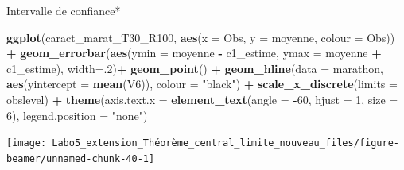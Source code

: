 \documentclass[ignorenonframetext,]{beamer}
\newenvironment{Shaded}{\begin{snugshade}}{\end{snugshade}}
\newcommand{\KeywordTok}[1]{\textcolor[rgb]{0.13,0.29,0.53}{\textbf{#1}}}
\newcommand{\DataTypeTok}[1]{\textcolor[rgb]{0.13,0.29,0.53}{#1}}
\newcommand{\DecValTok}[1]{\textcolor[rgb]{0.00,0.00,0.81}{#1}}
\newcommand{\StringTok}[1]{\textcolor[rgb]{0.31,0.60,0.02}{#1}}
\newcommand{\OperatorTok}[1]{\textcolor[rgb]{0.81,0.36,0.00}{\textbf{#1}}}
\newcommand{\NormalTok}[1]{#1}
\begin{document}
\begin{frame}[fragile]{Intervalle de confiance*}

\begin{Shaded}
\begin{Highlighting}[]
\KeywordTok{ggplot}\NormalTok{(caract_marat_T30_R100, }\KeywordTok{aes}\NormalTok{(}\DataTypeTok{x =}\NormalTok{ Obs, }\DataTypeTok{y =}\NormalTok{ moyenne, }\DataTypeTok{colour =}\NormalTok{ Obs)) }\OperatorTok{+}
\StringTok{  }\KeywordTok{geom_errorbar}\NormalTok{(}\KeywordTok{aes}\NormalTok{(}\DataTypeTok{ymin =}\NormalTok{ moyenne }\OperatorTok{-}\StringTok{ }\NormalTok{c1_estime, }\DataTypeTok{ymax =}\NormalTok{ moyenne }\OperatorTok{+}\StringTok{ }\NormalTok{c1_estime), }\DataTypeTok{width=}\NormalTok{.}\DecValTok{2}\NormalTok{)}\OperatorTok{+}\StringTok{ }
\StringTok{  }\KeywordTok{geom_point}\NormalTok{() }\OperatorTok{+}
\StringTok{  }\KeywordTok{geom_hline}\NormalTok{(}\DataTypeTok{data =}\NormalTok{ marathon, }\KeywordTok{aes}\NormalTok{(}\DataTypeTok{yintercept =} \KeywordTok{mean}\NormalTok{(V6)), }\DataTypeTok{colour =} \StringTok{"black"}\NormalTok{) }\OperatorTok{+}
\StringTok{  }\KeywordTok{scale_x_discrete}\NormalTok{(}\DataTypeTok{limits =}\NormalTok{ obslevel) }\OperatorTok{+}
\StringTok{  }\KeywordTok{theme}\NormalTok{(}\DataTypeTok{axis.text.x =} \KeywordTok{element_text}\NormalTok{(}\DataTypeTok{angle =} \OperatorTok{-}\DecValTok{60}\NormalTok{, }\DataTypeTok{hjust =} \DecValTok{1}\NormalTok{, }\DataTypeTok{size =} \DecValTok{6}\NormalTok{), }\DataTypeTok{legend.position =} \StringTok{"none"}\NormalTok{)}
\end{Highlighting}
\end{Shaded}

\texttt{[image: Labo5\_extension\_Théorème\_central\_limite\_nouveau\_files/figure-beamer/unnamed-chunk-40-1]}

\end{frame}
\end{document}
